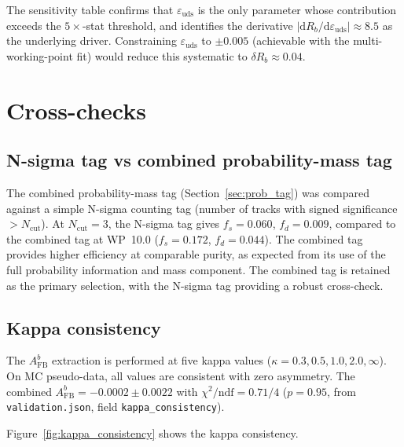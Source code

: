 \documentclass[11pt,a4paper]{article}
\begin{document}
The sensitivity table confirms that $\varepsilon_\mathrm{uds}$ is the only parameter
whose contribution exceeds the $5\times$-stat threshold, and identifies the derivative
$|\mathrm{d}R_b/\mathrm{d}\varepsilon_\mathrm{uds}| \approx 8.5$ as the underlying
driver. Constraining $\varepsilon_\mathrm{uds}$ to $\pm 0.005$ (achievable with the
multi-working-point fit) would reduce this systematic to $\delta R_b \approx 0.04$.

\FloatBarrier
{}
\section{Cross-checks}
\label{sec:crosschecks}

\subsection{N-sigma tag vs combined probability-mass tag}
\label{sec:xcheck_nsigma}

The combined probability-mass tag (Section~\ref{sec:prob_tag}) was compared against
a simple N-sigma counting tag (number of tracks with signed significance $> N_\mathrm{cut}$).
At $N_\mathrm{cut} = 3$, the N-sigma tag gives $f_s = 0.060$, $f_d = 0.009$, compared
to the combined tag at WP~10.0 ($f_s = 0.172$, $f_d = 0.044$). The combined tag
provides higher efficiency at comparable purity, as expected from its use of the full
probability information and mass component. The combined tag is retained as the primary
selection, with the N-sigma tag providing a robust cross-check.

\subsection{Kappa consistency}
\label{sec:xcheck_kappa}

The $A_\mathrm{FB}^b$ extraction is performed at five kappa values
($\kappa = 0.3, 0.5, 1.0, 2.0, \infty$). On MC pseudo-data, all values are
consistent with zero asymmetry.  The combined $A_\mathrm{FB}^b = -0.0002 \pm 0.0022$
with $\chi^2/\mathrm{ndf} = 0.71/4$ ($p = 0.95$,
from \texttt{validation.json}, field \texttt{kappa\_consistency}).

Figure~\ref{fig:kappa_consistency} shows the kappa consistency.
\end{document}
